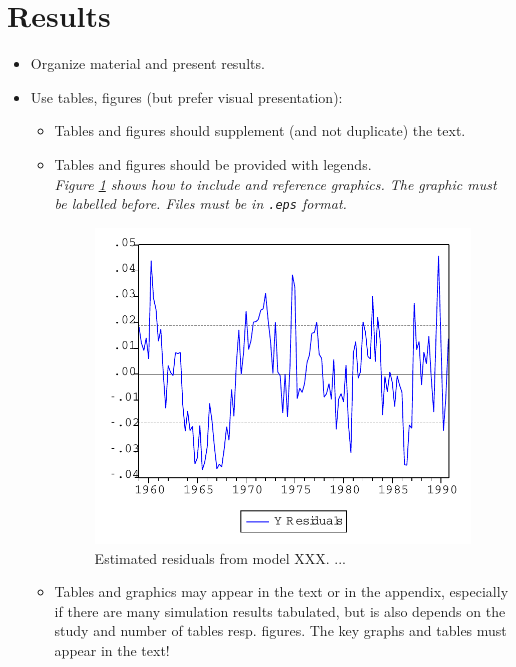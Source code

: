 \section{Results}\label{Sec:Results}

\begin{itemize}

\item Organize material and present results.

\item Use tables, figures (but prefer visual presentation):
\begin{itemize}
\item Tables and figures should supplement (and not duplicate) the
text.

\item Tables and figures should be provided with
legends.\\
{\it Figure \ref{Fig:Resids} shows how to include and reference
graphics. The graphic must be labelled before. Files must be in
\texttt{.eps} format.}

\begin{figure}[ht]
\begin{center}
\includegraphics[scale=0.5,angle=0]{graph}
\caption{Estimated residuals from model XXX. ...}
\label{Fig:Resids}
\end{center}
\end{figure}

\item Tables and graphics may appear in the text or in
the appendix, especially if there are many simulation results
tabulated, but is also depends on the study and number of tables resp.
figures. The key graphs and tables must appear in
the text!
\end{itemize}


\end{itemize}
